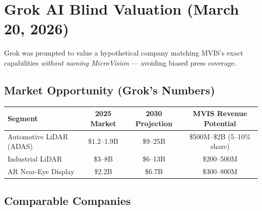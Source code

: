 \documentclass[11pt,letterpaper]{article}
\begin{document}
\section{Grok AI Blind Valuation (March 20, 2026)}

Grok was prompted to value a hypothetical company matching MVIS's exact capabilities \textit{without naming MicroVision} --- avoiding biased press coverage.

\begin{center}
\end{center}

\subsection{Market Opportunity (Grok's Numbers)}

\begin{center}
\begin{tabular}{@{}lccc@{}}
\toprule
\textbf{Segment} & \textbf{2025 Market} & \textbf{2030 Projection} & \textbf{MVIS Revenue Potential} \\
\midrule
Automotive LiDAR (ADAS) & \$1.2--1.9B & \$9--25B & \$500M--\$2B (5--10\% share) \\
Industrial LiDAR & \$3--8B & \$6--13B & \$200--500M \\
AR Near-Eye Display & \$2.2B & \$6.7B & \$300--800M \\
\bottomrule
\end{tabular}
\end{center}

\subsection{Comparable Companies}
\end{document}
